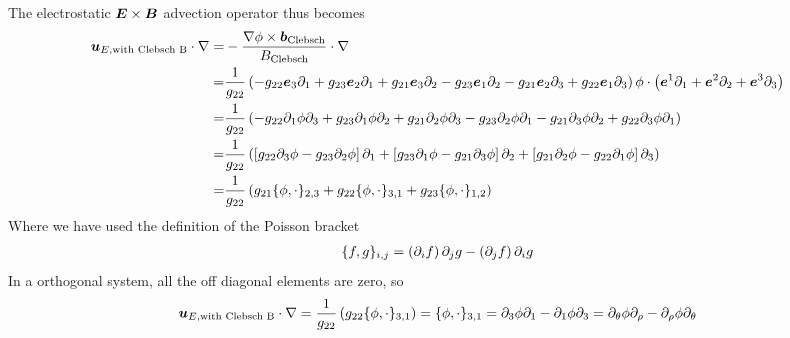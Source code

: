 %
The electrostatic $\boldsymbol{E}\times \boldsymbol{B}$ advection operator thus becomes
%
\begin{align*}
    \boldsymbol{u}_{E, \text{with Clebsch B}}\cdot\nabla
    =& -\frac{\nabla\phi\times\boldsymbol{b}_\text{Clebsch}}{B_\text{Clebsch}}\cdot\nabla\\
    =&\frac{1}{g_{22}}
           \left(
           - g_{22}\boldsymbol{e}_3\partial_1
           + g_{23}\boldsymbol{e}_2\partial_1
           + g_{21}\boldsymbol{e}_3\partial_2
           - g_{23}\boldsymbol{e}_1\partial_2
           - g_{21}\boldsymbol{e}_2\partial_3
           + g_{22}\boldsymbol{e}_1\partial_3
           \right)
           \phi
       \cdot\left(\boldsymbol{e}^1\partial_1 + \boldsymbol{e}^2\partial_2 + \boldsymbol{e}^3\partial_3\right)\\
    =& \frac{1}{g_{22}}
           \left(
           - g_{22}\partial_1\phi\partial_3
           + g_{23}\partial_1\phi\partial_2
           + g_{21}\partial_2\phi\partial_3
           - g_{23}\partial_2\phi\partial_1
           - g_{21}\partial_3\phi\partial_2
           + g_{22}\partial_3\phi\partial_1
           \right)\\
    =& \frac{1}{g_{22}}
           \left(
             \left[
               g_{22}\partial_3\phi
             - g_{23}\partial_2\phi
             \right]\partial_1
           +
             \left[
               g_{23}\partial_1\phi
             - g_{21}\partial_3\phi
             \right]\partial_2
           +
             \left[
               g_{21}\partial_2\phi
             - g_{22}\partial_1\phi
             \right]\partial_3
           \right)\\
    =& \frac{1}{g_{22}}
               \left(
                 g_{21}\{\phi, \cdot\}_{2,3}
                 +
                 g_{22}\{\phi, \cdot\}_{3,1}
                 +
                 g_{23}\{\phi, \cdot\}_{1,2}
               \right)
\end{align*}
%
Where we have used the definition of the Poisson bracket
%
\begin{align*}
    \{f, g\}_{i,j} = \left(\partial_i f\right) \partial_j g - \left(\partial_j f\right) \partial_i g
\end{align*}
%
In a orthogonal system, all the off diagonal elements are zero, so
%
\begin{align}
    \boldsymbol{u}_{E, \text{with Clebsch B}}\cdot\nabla
    = \frac{1}{g_{22}} \left( g_{22}\{\phi, \cdot\}_{3,1} \right)
    = \{\phi, \cdot\}_{3,1}
    = \partial_3\phi\partial_1 - \partial_1\phi\partial_3
    = \partial_\theta\phi\partial_\rho - \partial_\rho\phi\partial_\theta
    \label{poi:defClebsh}
\end{align}
